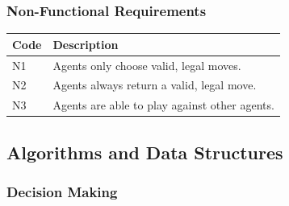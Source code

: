 \documentclass[12pt,a4paper]{article}
\begin{document}
    \subsubsection*{Non-Functional Requirements}
      
    \begin{center}
        \begin{tabular*}{1\textwidth}{| l | p{144.5mm} |}
        \hline
        Code & Description \\ \hline
        N1 & Agents only choose valid, legal moves. \\ \hline
        N2 & Agents always return a valid, legal move.\\ \hline
        N3 & Agents are able to play against other agents. \\ \hline
        \end{tabular*}
    \end{center}



\subsection*{Algorithms and Data Structures}

\subsubsection{Decision Making}
\end{document}
